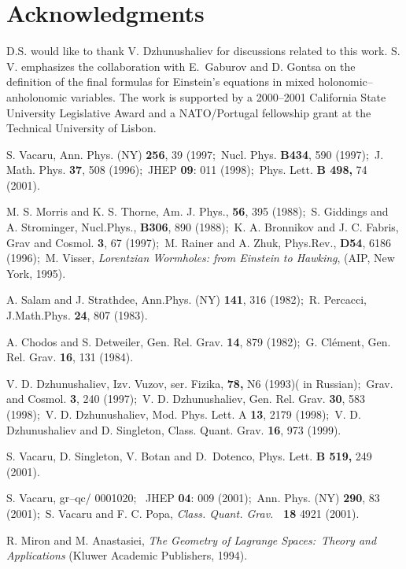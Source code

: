 \documentclass[a4paper,preprint,prabib,aps]{revtex4}
\begin{document}
\section*{Acknowledgments}

D.S. would like to thank V. Dzhunushaliev for discussions related to this
work. S. V. emphasizes the collaboration with E.\ Gaburov and D. Gontsa on
the definition of the final formulas for Einstein's equations in mixed
holonomic--anholonomic variables. The work is supported by a 2000--2001
California State University Legislative Award and
a NATO/Portugal fellowship grant at the Technical University of Lisbon.


\begin{references}

  S. Vacaru, Ann. Phys. (NY) {\bf 256}, 39 (1997;\
Nucl. Phys. {\bf B434}, 590 (1997);\ J. Math. Phys. {\bf 37}, 508
(1996);\ JHEP {\bf 09}: 011 (1998);\ Phys. Lett. {\bf B 498,} 74
(2001).

  M. S. Morris and K. S. Thorne, Am. J. Phys., {\bf 56}, 395
(1988);\ S. Giddings and A. Strominger, Nucl.Phys., {\bf B306}, 890 (1988);\
K. A. Bronnikov and J. C. Fabris, Grav and Cosmol. {\bf 3}, 67 (1997);\ M.
Rainer and A. Zhuk, Phys.Rev., {\bf D54}, 6186 (1996);\ M. Visser, {\it 
Lorentzian Wormholes: from Einstein to Hawking}, (AIP, New York, 1995).

\bibitem{sal}  A. Salam and J. Strathdee, Ann.Phys. (NY) {\bf 141}, 316
(1982);\ R. Percacci, J.Math.Phys. {\bf 24}, 807 (1983).

  A. Chodos and S. Detweiler, Gen. Rel. Grav. {\bf 14}, 879
(1982);\ G. Cl\'{e}ment, Gen. Rel. Grav. {\bf 16}, 131 (1984).\

\bibitem{dzhsin}  V. D. Dzhunushaliev, Izv. Vuzov, ser. Fizika, {\bf 78,} N6
(1993)( in Russian);\ Grav. and Cosmol. {\bf 3}, 240 (1997);\ V. D.
Dzhunushaliev, Gen. Rel. Grav. {\bf 30}, 583 (1998);\ V. D. Dzhunushaliev,
Mod. Phys. Lett. A {\bf 13}, 2179 (1998);\ V. D. Dzhunushaliev and D.
Singleton, Class. Quant. Grav. {\bf 16}, 973 (1999).

  S. Vacaru, D. Singleton, V. Botan and D.\ Dotenco, Phys.
Lett. {\bf B 519,} 249 (2001).

  S. Vacaru, gr--qc/ 0001020; \ JHEP {\bf 04}: 009 (2001);\
Ann. Phys. (NY) {\bf 290}, 83 (2001);\ S. Vacaru and F. C. Popa,
{\sl Class. Quant. Grav.} {\bf \ 18 } 4921 (2001).

\bibitem{miron} R. Miron and M. Anastasiei, {\it The Geometry of Lagrange
Spaces:\ Theory and Applications} (Kluwer Academic Publishers, 1994).


\end{references}
\end{document}
